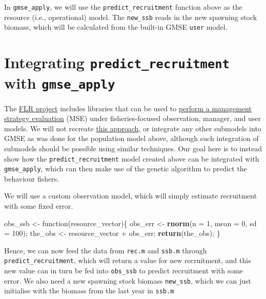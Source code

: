 \documentclass[]{article}
\newenvironment{Shaded}{\begin{snugshade}}{\end{snugshade}}
\newcommand{\KeywordTok}[1]{\textcolor[rgb]{0.13,0.29,0.53}{\textbf{{#1}}}}
\newcommand{\DataTypeTok}[1]{\textcolor[rgb]{0.13,0.29,0.53}{{#1}}}
\newcommand{\DecValTok}[1]{\textcolor[rgb]{0.00,0.00,0.81}{{#1}}}
\newcommand{\StringTok}[1]{\textcolor[rgb]{0.31,0.60,0.02}{{#1}}}
\newcommand{\NormalTok}[1]{{#1}}
\begin{document}
In \texttt{gmse\_apply}, we will use the \texttt{predict\_recruitment}
function above as the resource (i.e., operational) model. The
\texttt{new\_ssb} reads in the new spawning stock biomass, which will be
calculated from the built-in GMSE \texttt{user} model.

\section{\texorpdfstring{Integrating \texttt{predict\_recruitment} with
\texttt{gmse\_apply}}{Integrating predict\_recruitment with gmse\_apply}}\label{integrating-predict_recruitment-with-gmse_apply}

The \href{http://www.flr-project.org/}{FLR project} includes libraries
that can be used to
\href{http://www.flr-project.org/doc/An_introduction_to_MSE_using_FLR.html}{perform
a management strategy evaluation} (MSE) under fisheries-focused
observation, manager, and user models. We will not recreate
\href{http://www.flr-project.org/doc/An_introduction_to_MSE_using_FLR.html}{this
approach}, or integrate any other submodels into GMSE as was done for
the population model above, although such integration of submodels
should be possible using similar techniques. Our goal here is to instead
show how the \texttt{predict\_recruitment} model created above can be
integrated with \texttt{gmse\_apply}, which can then make use of the
genetic algorithm to predict the behaviour fishers.

We will use a custom observation model, which will simply estimate
recruitment with some fixed error.

\begin{Shaded}
\begin{Highlighting}[]
\NormalTok{obs_ssb <-}\StringTok{ }\NormalTok{function(resource_vector)\{}
    \NormalTok{obs_err <-}\StringTok{ }\KeywordTok{rnorm}\NormalTok{(}\DataTypeTok{n =} \DecValTok{1}\NormalTok{, }\DataTypeTok{mean =} \DecValTok{0}\NormalTok{, }\DataTypeTok{sd =} \DecValTok{100}\NormalTok{);}
    \NormalTok{the_obs <-}\StringTok{ }\NormalTok{resource_vector +}\StringTok{ }\NormalTok{obs_err;}
    \KeywordTok{return}\NormalTok{(the_obs);}
\NormalTok{\}}
\end{Highlighting}
\end{Shaded}

Hence, we can now feed the data from \texttt{rec.m} and \texttt{ssb.m}
through \texttt{predict\_recruitment}, which will return a value for new
recruitment, and this new value can in turn be fed into
\texttt{obs\_ssb} to predict recruitment with some error. We also need a
new spawning stock biomass \texttt{new\_ssb}, which we can just
initialise with the biomass from the last year in \texttt{ssb.m}
\end{document}
